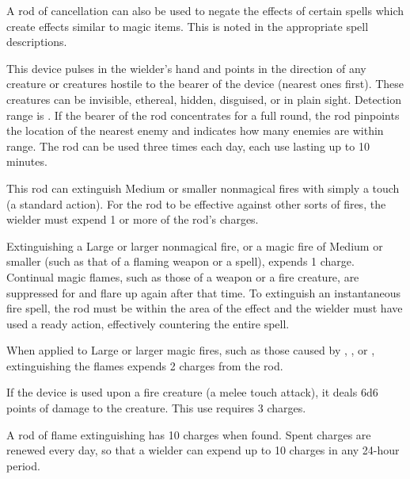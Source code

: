 A rod of cancellation can also be used to negate the effects of certain spells which create effects similar to magic items. This is noted in the appropriate spell descriptions.


 This device pulses in the wielder's hand and points in the direction of any creature or creatures hostile to the bearer of the device (nearest ones first). These creatures can be invisible, ethereal, hidden, disguised, or in plain sight. Detection range is . If the bearer of the rod concentrates for a full round, the rod pinpoints the location of the nearest enemy and indicates how many enemies are within range. The rod can be used three times each day, each use lasting up to 10 minutes.


 This rod can extinguish Medium or smaller nonmagical fires with simply a touch (a standard action). For the rod to be effective against other sorts of fires, the wielder must expend 1 or more of the rod's charges.

Extinguishing a Large or larger nonmagical fire, or a magic fire of Medium or smaller (such as that of a flaming weapon or a  spell), expends 1 charge. Continual magic flames, such as those of a weapon or a fire creature, are suppressed for  and flare up again after that time. To extinguish an instantaneous fire spell, the rod must be within the area of the effect and the wielder must have used a ready action, effectively countering the entire spell.

When applied to Large or larger magic fires, such as those caused by , , or , extinguishing the flames expends 2 charges from the rod.

If the device is used upon a fire creature (a melee touch attack), it deals 6d6 points of damage to the creature. This use requires 3 charges.

A rod of flame extinguishing has 10 charges when found. Spent charges are renewed every day, so that a wielder can expend up to 10 charges in any 24-hour period.

